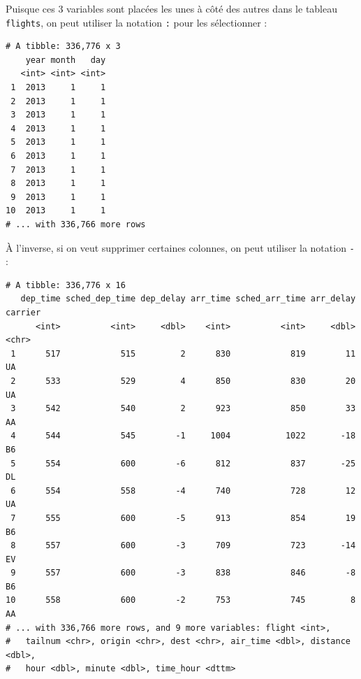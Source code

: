 \documentclass[a4paperpaper,]{article}
\newenvironment{Shaded}{\begin{snugshade}}{\end{snugshade}}
\newcommand{\CommentTok}[1]{\textcolor[rgb]{0.54,0.53,0.53}{#1}}
\newcommand{\KeywordTok}[1]{\textcolor[rgb]{0.12,0.11,0.11}{\textbf{#1}}}
\newcommand{\NormalTok}[1]{\textcolor[rgb]{0.12,0.11,0.11}{#1}}
\newcommand{\OperatorTok}[1]{\textcolor[rgb]{0.12,0.11,0.11}{#1}}
\newcommand{\StringTok}[1]{\textcolor[rgb]{0.75,0.01,0.01}{#1}}
\theoremstyle{definition}
\theoremstyle{definition}
\theoremstyle{definition}
\theoremstyle{remark}
\begin{document}
Puisque ces 3 variables sont placées les unes à côté des autres dans le
tableau \texttt{flights}, on peut utiliser la notation \texttt{:} pour
les sélectionner :

\begin{Shaded}
\end{Shaded}

\begin{verbatim}
# A tibble: 336,776 x 3
    year month   day
   <int> <int> <int>
 1  2013     1     1
 2  2013     1     1
 3  2013     1     1
 4  2013     1     1
 5  2013     1     1
 6  2013     1     1
 7  2013     1     1
 8  2013     1     1
 9  2013     1     1
10  2013     1     1
# ... with 336,766 more rows
\end{verbatim}

À l'inverse, si on veut supprimer certaines colonnes, on peut utiliser
la notation \texttt{-} :

\begin{Shaded}
\end{Shaded}

\begin{verbatim}
# A tibble: 336,776 x 16
   dep_time sched_dep_time dep_delay arr_time sched_arr_time arr_delay carrier
      <int>          <int>     <dbl>    <int>          <int>     <dbl> <chr>  
 1      517            515         2      830            819        11 UA     
 2      533            529         4      850            830        20 UA     
 3      542            540         2      923            850        33 AA     
 4      544            545        -1     1004           1022       -18 B6     
 5      554            600        -6      812            837       -25 DL     
 6      554            558        -4      740            728        12 UA     
 7      555            600        -5      913            854        19 B6     
 8      557            600        -3      709            723       -14 EV     
 9      557            600        -3      838            846        -8 B6     
10      558            600        -2      753            745         8 AA     
# ... with 336,766 more rows, and 9 more variables: flight <int>,
#   tailnum <chr>, origin <chr>, dest <chr>, air_time <dbl>, distance <dbl>,
#   hour <dbl>, minute <dbl>, time_hour <dttm>
\end{verbatim}
\end{document}
